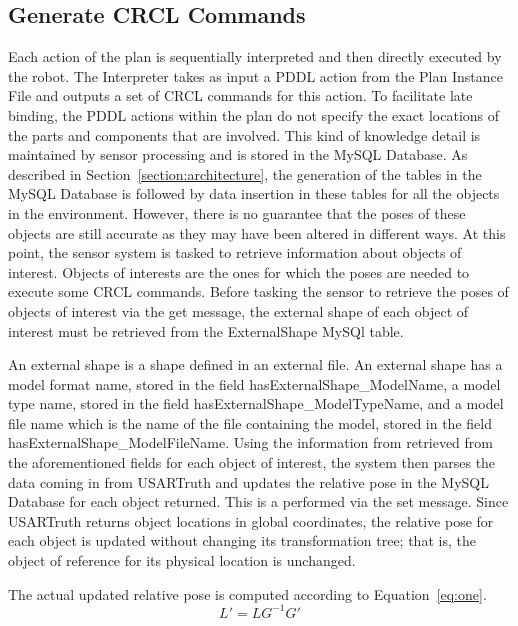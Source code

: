 \subsection{Generate CRCL Commands}
\label{subsection:CRCL}
Each action of the plan is sequentially interpreted and then directly executed by the robot. The \textsf{Interpreter} takes as input a PDDL action from the \textsf{Plan Instance File} and outputs a set of CRCL commands for this action. To facilitate late binding, the PDDL actions within the plan  do not specify the exact locations of the parts and components that are involved. This kind of knowledge detail is maintained by sensor processing and is stored in the \textsf{MySQL Database}. As described in Section~\ref{section:architecture}, the generation of the tables in the \textsf{MySQL Database} is followed by data insertion in these tables for all the objects in the environment. However, there is no guarantee that the poses of these objects are still accurate as they may have been altered in different ways. At this point, the sensor system is tasked to retrieve information about objects of interest. Objects of interests are the ones for which the poses are needed to execute some CRCL commands. Before tasking the sensor to retrieve the poses of objects of interest via the \textsf{get} message, the external shape of each object of interest must be retrieved from the \textsf{ExternalShape} MySQl table.

An external shape is a shape defined in an external file. An external shape has a model format name, stored in the field \textsf{hasExternalShape\_ModelName}, a model type name, stored in the field \textsf{hasExternalShape\_ModelTypeName}, and a model file name which is the name of the file containing the model, stored in the field \textsf{hasExternalShape\_ModelFileName}. Using the information from retrieved from the aforementioned fields for each object of interest, the system then parses the data coming in from USARTruth and updates the relative pose in the \textsf{MySQL Database} for each object returned. This is a performed via the \textsf{set} message. Since USARTruth returns object locations in global coordinates, the relative pose for each object is updated without changing its transformation tree; that is, the object of reference for its physical location is unchanged. 


The actual updated relative pose is computed according to Equation~\ref{eq:one}.
 \begin{equation}
\label{eq:one}
 L' = LG^{-1}G'
 \end{equation}

